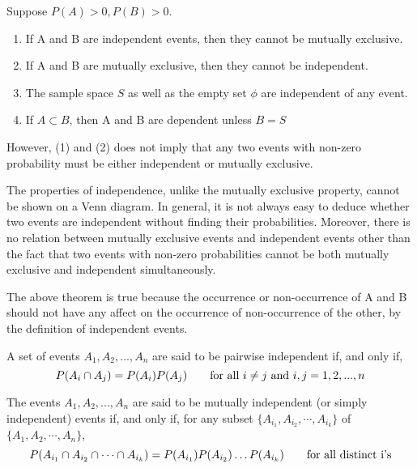 \begin{note}\end{note}
Suppose $P(A) > 0, P(B) > 0$. 
\begin{enumerate}
    \item If A and B are independent events, then they cannot be mutually exclusive.
    \item If A and B are mutually exclusive, then they cannot be independent.
    \item The sample space $S$ as well as the empty set $\phi$ are independent of any event.
    \item If $A \subset B$, then A and B are dependent unless $B = S$
\end{enumerate}
However, (1) and (2) does not imply that any two events with non-zero probability must be either independent or mutually exclusive. 

\begin{note}\end{note}
The properties of independence, unlike the mutually exclusive property, cannot be shown on a Venn diagram. In general, it is not always easy to deduce whether two events are independent without finding their probabilities. Moreover, there is no relation between mutually exclusive events and independent events other than the fact that two events with non-zero probabilities cannot be both mutually exclusive and independent simultaneously.


The above theorem is true because the occurrence or non-occurrence of A and B should not have any affect on the occurrence of non-occurrence of the other, by the definition of independent events.

\begin{definition}
A set of events $A_1, A_2, ..., A_n$ are said to be pairwise independent if, and only if, $$
P(A_i \cap A_j) = P(A_i)P(A_j) \text{\qquad for all } i \neq j \text{ and }
i,j = 1,2,...,n
$$
\end{definition}

\begin{definition}
The events $A_1, A_2, ..., A_n$ are said to be mutually independent (or simply independent) events if, and only if, for any subset $\{A_{i_1}, A_{i_2}, \cdots, A_{i_k}\}$ of $\{A_1, A_2, \cdots, A_n\}$, 
$$
P(A_{i_1} \cap A_{i_2} \cap \cdots \cap A_{i_k}) = P(A_{i_1}) P(A_{i_2}) \dots P(A_{i_k}) \text{\qquad for all distinct i's}
$$
\end{definition}

